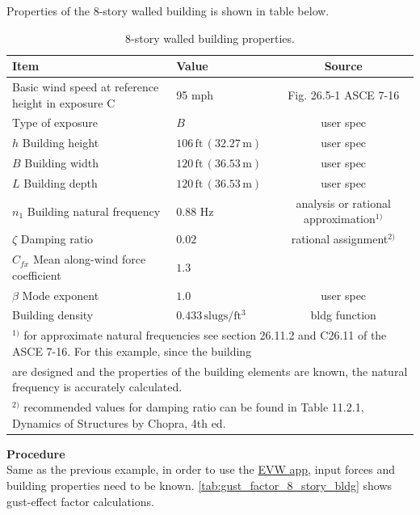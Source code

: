 \documentclass[onecolumn, fleqn]{article}
\newcommand{\ft}{\ensuremath{\,\mathrm{ft}}}
\newcommand{\m}{\ensuremath{\,\mathrm{m}}}
\begin{document}
Properties of the 8-story walled building is shown in table below.
\begin{table}[H]
\centering \caption{8-story walled building properties.}
\begin{tabular}{llc}
\toprule
Item		& Value		& Source		\\
\midrule
Basic wind speed at reference height in exposure C	& 95 mph						& Fig. 26.5-1 ASCE 7-16		\\
Type of exposure									& $B$							& user spec					\\
$h$ Building height									& $106\ft \,(32.27\m)$			& user spec					\\
$B$ Building width									& $120\ft \,(36.53\m)$			& user spec					\\
$L$ Building depth									& $120\ft \,(36.53\m)$			& user spec					\\
$n_1$ Building natural frequency					& $0.88$ Hz						& analysis or rational approximation$^{1)}$\\
$\zeta$ Damping ratio								& $0.02$						& rational assignment$^{2)}$		\\
$C_{fx}$ Mean along-wind force coefficient			& $1.3$							& 							\\
$\beta$ Mode exponent								& $1.0$							& user spec					\\
Building density									& $0.433 \,\mathrm{slugs/ft^3}$	& bldg function				\\
\bottomrule
\multicolumn{3}{l}{\footnotesize $^{1)}$ for approximate natural frequencies see section 26.11.2 and C26.11 of the ASCE 7-16. For this example, since the building}	\\
\multicolumn{3}{l}{\footnotesize \hspace{3mm} are designed and the properties of the building elements are known, the natural frequency is accurately calculated.}	\\
\multicolumn{3}{l}{\footnotesize $^{2)}$ recommended values for damping ratio can be found in Table 11.2.1, Dynamics of Structures by
Chopra, 4th ed. \citep{ChopraAnilK2012Dos}}
\end{tabular}
\end{table}

\noindent\textbf{Procedure}\\
\indent Same as the previous example, in order to use the \href{https://simcenter.designsafe-ci.org/learning-tools/evw-application/}{EVW app}, input forces and building properties need to be known. \cref{tab:gust_factor_8_story_bldg} shows gust-effect factor calculations.
\end{document}

